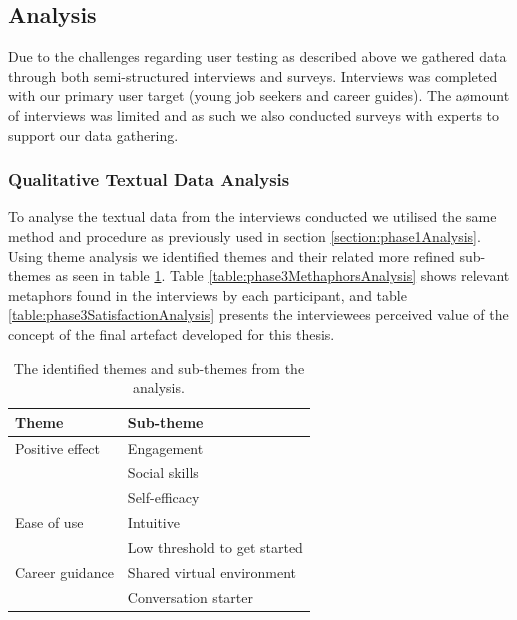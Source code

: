 






\subsection{Analysis}
Due to the challenges regarding user testing as described above we gathered data through both semi-structured interviews and surveys. Interviews was completed with our primary user target (young job seekers and career guides). The aømount of interviews was limited and as such we also conducted surveys with experts to support our data gathering.      


\subsubsection{Qualitative Textual Data Analysis}
To analyse the textual data from the interviews conducted we utilised the same method and procedure as previously used in section \ref{section:phase1Analysis}. Using theme analysis we identified themes and their related more refined sub-themes as seen in table \ref{table:phase3ThemeAnalysis}. Table \ref{table:phase3MethaphorsAnalysis} shows relevant metaphors found in the interviews by each participant, and table \ref{table:phase3SatisfactionAnalysis} presents the interviewees perceived value of the concept of the final artefact developed for this thesis.


\begin{table}[H]
      \centering
        \begin{tabular}{ll}
        \toprule
        Theme & Sub-theme \\
        \midrule
       Positive effect & Engagement\\
        & Social skills \\\vspace{0.2cm}
        & Self-efficacy \\
        Ease of use & Intuitive\\\vspace{0.2cm}
        & Low threshold to get started \\
        Career guidance & Shared virtual environment\\\vspace{0.2cm}
        & Conversation starter \\
        \bottomrule
        \end{tabular}
        \caption{The identified themes and sub-themes from the analysis.}
        \label{table:phase3ThemeAnalysis}
\end{table}






